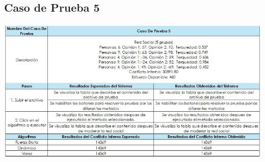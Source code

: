 \documentclass[11pt,letter]{article}
\begin{document}
    \subsection{Caso de Prueba 5}
    \begin{flushleft}
        \includegraphics[width=\linewidth]{resources/cp5.jpeg}
    \end{flushleft}

\end{document}
